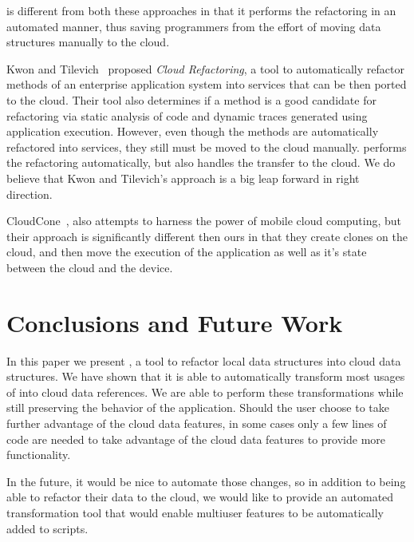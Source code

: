 \documentclass{sigplanconf}
\begin{document}
\tool is different from both these approaches in that it performs the refactoring in an automated manner, thus saving programmers from the effort of moving data structures manually to the cloud.  

Kwon and Tilevich~\cite{kwon2013cloud} proposed \emph{Cloud Refactoring}, a tool to automatically refactor methods of an enterprise application system into services that can be then ported to the cloud. Their tool also determines if a method is a good candidate for refactoring via static analysis of code and dynamic traces generated using application execution. However, even though the methods are automatically refactored into services, they still must be moved to the cloud manually.  \tool performs the refactoring automatically, but also handles the transfer to the cloud.  We do believe that Kwon and Tilevich's approach is a big leap forward in right direction.  

CloudCone~\cite{chun2011clonecloud}, also attempts to harness the power of mobile cloud computing, but their approach is significantly different then ours in that they create clones on the cloud, and then move the execution of the application as well as it's state between the cloud and the device.

\section{Conclusions and Future Work}
\label{sec:conclusions}
In this paper we present \tool, a tool to refactor local data structures into cloud data structures.  We have shown that it is able to automatically transform most usages of \NC{} into cloud data references.  We are able to perform these transformations while still preserving the behavior of the application.  Should the user choose to take further advantage of the cloud data features, in some cases only a few lines of code are needed to take advantage of the cloud data features to provide more functionality. 

In the future, it would be nice to automate those changes, so in addition to being able to refactor their data to the cloud, we would like to provide an automated transformation tool that would enable multiuser features to be automatically added to scripts.









\end{document}
